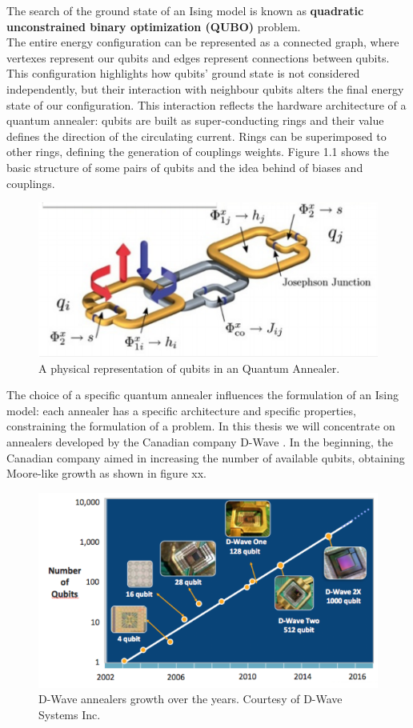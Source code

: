 The search of the ground state of an Ising model is known as \textbf{quadratic unconstrained binary optimization (QUBO)} problem. \\
The entire energy configuration can be represented as a connected graph, where vertexes represent our qubits and edges represent connections between qubits. This configuration highlights how qubits' ground state is not considered independently, but their interaction with neighbour qubits alters the final energy state of our configuration. This interaction reflects the hardware architecture of a quantum annealer: qubits are built as super-conducting rings and their value defines the direction of the circulating current. Rings can be superimposed to other rings, defining the generation of couplings weights. Figure 1.1 shows the basic structure of some pairs of qubits and the idea behind of biases and couplings. \\
\begin{figure}[t]
	\begin{center}
	\includegraphics{QA.PNG}
	\caption{A physical representation of qubits in an Quantum Annealer.}
	\end{center}
\end{figure}
The choice of a specific quantum annealer influences the formulation of an Ising model: each annealer has a specific architecture and specific properties, constraining the formulation of a problem. In this thesis we will concentrate on annealers developed by the Canadian company D-Wave \cite{Dwave}. In the beginning, the Canadian company aimed in increasing the number of available qubits, obtaining Moore-like growth as shown in figure xx. 
\begin{figure}[t]
	\begin{center}
	\includegraphics{DwaveMoore.PNG}
	\caption{D-Wave annealers growth over the years. Courtesy of D-Wave Systems Inc.}
	\end{center}
\end{figure}
